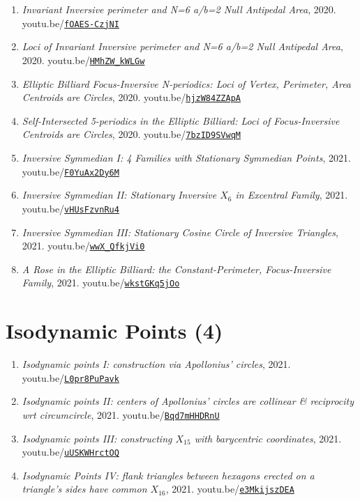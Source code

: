 \documentclass[12pt]{article}
\begin{document}
\begin{enumerate}[resume]
\item \textit{Invariant Inversive perimeter and N=6 a/b=2 Null Antipedal Area}, 2020. youtu.be/\href{https://youtu.be/fOAES-CzjNI}{\nolinkurl{fOAES-CzjNI}}
\item \textit{Loci of Invariant Inversive perimeter and N=6 a/b=2 Null Antipedal Area}, 2020. youtu.be/\href{https://youtu.be/HMhZW_kWLGw}{\nolinkurl{HMhZW\_kWLGw}}
\item \textit{Elliptic Billiard Focus-Inversive N-periodics: Loci of Vertex, Perimeter, Area Centroids are Circles}, 2020. youtu.be/\href{https://youtu.be/hjzW84ZZApA}{\nolinkurl{hjzW84ZZApA}}
\item \textit{Self-Intersected 5-periodics in the Elliptic Billiard: Loci of Focus-Inversive Centroids are Circles}, 2020. youtu.be/\href{https://youtu.be/7bzID9SVwqM}{\nolinkurl{7bzID9SVwqM}}
\item \textit{Inversive Symmedian I: 4 Families with Stationary Symmedian Points}, 2021. youtu.be/\href{https://youtu.be/F0YuAx2Dy6M}{\nolinkurl{F0YuAx2Dy6M}}
\item \textit{Inversive Symmedian II: Stationary Inversive $X_{6}$ in Excentral Family}, 2021. youtu.be/\href{https://youtu.be/vHUsFzvnRu4}{\nolinkurl{vHUsFzvnRu4}}
\item \textit{Inversive Symmedian III: Stationary Cosine Circle of Inversive Triangles}, 2021. youtu.be/\href{https://youtu.be/wwX_QfkjVi0}{\nolinkurl{wwX\_QfkjVi0}}
\item \textit{A Rose in the Elliptic Billiard: the Constant-Perimeter, Focus-Inversive Family}, 2021. youtu.be/\href{https://youtu.be/wkstGKq5jOo}{\nolinkurl{wkstGKq5jOo}}
\end{enumerate}

\section{Isodynamic Points (4)}

\begin{enumerate}[resume]
\item \textit{Isodynamic points I: construction via Apollonius' circles}, 2021. youtu.be/\href{https://youtu.be/L0pr8PuPavk}{\nolinkurl{L0pr8PuPavk}}
\item \textit{Isodynamic points II: centers of Apollonius' circles are collinear \& reciprocity wrt circumcircle}, 2021. youtu.be/\href{https://youtu.be/Bqd7mHHDRnU}{\nolinkurl{Bqd7mHHDRnU}}
\item \textit{Isodynamic points III: constructing $X_{15}$ with barycentric coordinates}, 2021. youtu.be/\href{https://youtu.be/uUSKWHrctOQ}{\nolinkurl{uUSKWHrctOQ}}
\item \textit{Isodynamic Points IV: flank triangles between hexagons erected on a triangle's sides have common $X_{16}$}, 2021. youtu.be/\href{https://youtu.be/e3MkijszDEA}{\nolinkurl{e3MkijszDEA}}
\end{enumerate}
\end{document}
